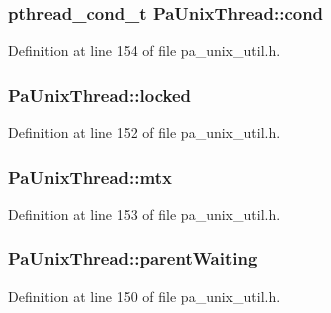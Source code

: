 \subsubsection[{\texorpdfstring{cond}{cond}}]{\setlength{\rightskip}{0pt plus 5cm}pthread\+\_\+cond\+\_\+t Pa\+Unix\+Thread\+::cond}\hypertarget{struct_pa_unix_thread_a299169d46cc51d9a198f97d55e0b8548}{}\label{struct_pa_unix_thread_a299169d46cc51d9a198f97d55e0b8548}


Definition at line 154 of file pa\+\_\+unix\+\_\+util.\+h.

\subsubsection[{\texorpdfstring{locked}{locked}}]{ Pa\+Unix\+Thread\+::locked}\hypertarget{struct_pa_unix_thread_af9983a628000e65ff4740f65eb81002f}{}\label{struct_pa_unix_thread_af9983a628000e65ff4740f65eb81002f}


Definition at line 152 of file pa\+\_\+unix\+\_\+util.\+h.

\subsubsection[{\texorpdfstring{mtx}{mtx}}]{ Pa\+Unix\+Thread\+::mtx}\hypertarget{struct_pa_unix_thread_a37549f65c3b18dc1d0a3620508536c1e}{}\label{struct_pa_unix_thread_a37549f65c3b18dc1d0a3620508536c1e}


Definition at line 153 of file pa\+\_\+unix\+\_\+util.\+h.

\subsubsection[{\texorpdfstring{parent\+Waiting}{parentWaiting}}]{ Pa\+Unix\+Thread\+::parent\+Waiting}\hypertarget{struct_pa_unix_thread_a1a0caeed9f5d8be47721158331702d0b}{}\label{struct_pa_unix_thread_a1a0caeed9f5d8be47721158331702d0b}


Definition at line 150 of file pa\+\_\+unix\+\_\+util.\+h.

